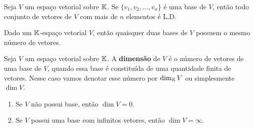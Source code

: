 \documentclass{beamer}
\begin{document}
\begin{frame}
  \begin{teorema}
    Seja $V$ um espaço vetorial sobre $\mathbb{K}$. \pause Se $\{v_1, v_2, \dots, v_n\}$ é uma base de $V$, \pause então todo conjunto de vetores de $V$ \pause com mais de $n$ elementos \pause é L.D.\pause 
  \end{teorema}

  \begin{corolario}
    Dado um $\mathbb{K}$-espaço vetorial $V$, \pause então quaisquer duas bases de $V$ possuem o mesmo número de vetores.
  \end{corolario}
\end{frame}

\begin{frame}
  \begin{definicao}
    Seja $V$ um espaço vetorial sobre $\mathbb{K}$. \pause A \textbf{dimensão} de $V$ \pause é o número de vetores de uma base de $V$, \pause quando essa base é constituída de uma quantidade finita de vetores.\pause 
    Nesse caso vamos denotar esse número por $\dim_{\mathbb{K}}V$ \pause ou simplesmente $\dim V$.\pause 
  \end{definicao}

  \begin{observacoes}
    \begin{enumerate}[label={\roman*})]
      \item Se $V$ não possui base, \pause então $\dim V = 0$.\pause 

      \item Se $V$ possui uma base com infinitos vetores, \pause então $\dim V = \infty$.
    \end{enumerate}
  \end{observacoes}
\end{frame}
\end{document}
